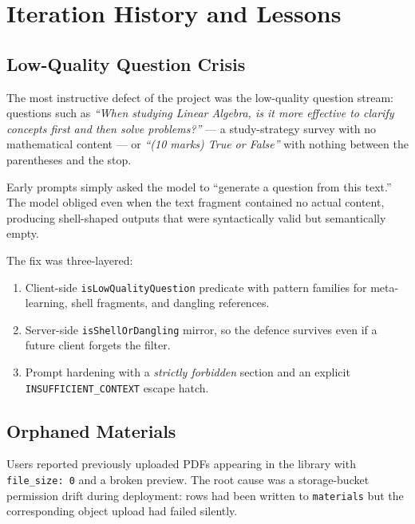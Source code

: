\documentclass[11pt,a4paper]{article}
\newcommand{\code}[1]{\texttt{\small #1}}
\begin{document}
\section{Iteration History and Lessons}
\label{sec:iterations}

\subsection{Low-Quality Question Crisis}

The most instructive defect of the project was the low-quality question stream: questions such as \emph{``When studying Linear Algebra, is it more effective to clarify concepts first and then solve problems?''} --- a study-strategy survey with no mathematical content --- or \emph{``(10 marks) True or False''} with nothing between the parentheses and the stop.

\begin{tcolorbox}[pitfall,title=Pitfall: Trusting the LLM's Own Framing]
Early prompts simply asked the model to ``generate a question from this text.'' The model obliged even when the text fragment contained no actual content, producing shell-shaped outputs that were syntactically valid but semantically empty.
\end{tcolorbox}

The fix was three-layered:

\begin{enumerate}[leftmargin=*]
    \item Client-side \code{isLowQualityQuestion} predicate with pattern families for meta-learning, shell fragments, and dangling references.
    \item Server-side \code{isShellOrDangling} mirror, so the defence survives even if a future client forgets the filter.
    \item Prompt hardening with a \emph{strictly forbidden} section and an explicit \code{INSUFFICIENT\_CONTEXT} escape hatch.
\end{enumerate}

\subsection{Orphaned Materials}

Users reported previously uploaded PDFs appearing in the library with \code{file\_size:~0} and a broken preview. The root cause was a storage-bucket permission drift during deployment: rows had been written to \code{materials} but the corresponding object upload had failed silently.
\end{document}
